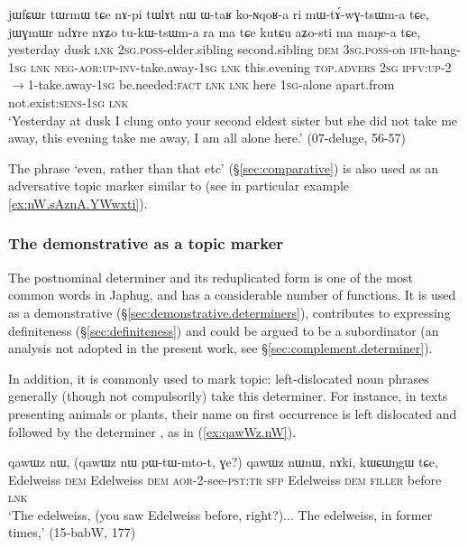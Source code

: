 \begin{exe}
\ex \label{ex:jWGmWr.ndAre}
\gll jɯfɕɯr tɯrmɯ tɕe nɤ-pi tɯlɤt nɯ ɯ-taʁ ko-ɴqoʁ-a ri mɯ-tɤ́-wɣ-tsɯm-a tɕe,
jɯɣmɯr ndɤre nɤʑo tu-kɯ-tsɯm-a ra ma tɕe kutɕu aʑo-sti ma maŋe-a tɕe, \\
 yesterday dusk \textsc{lnk} \textsc{2sg}.\textsc{poss}-elder.sibling  second.sibling \textsc{dem} \textsc{3sg}.\textsc{poss}-on \textsc{ifr}-hang-\textsc{1sg} \textsc{lnk} \textsc{neg}-\textsc{aor}:\textsc{up}-\textsc{inv}-take.away-\textsc{1sg} \textsc{lnk} this.evening \textsc{top}.\textsc{advers}  \textsc{2sg} \textsc{ipfv}:\textsc{up}-2$\rightarrow$1-take.away-\textsc{1sg} be.needed:\textsc{fact} \textsc{lnk} \textsc{lnk} here \textsc{1sg}-alone apart.from  not.exist:\textsc{sens}-\textsc{1sg} \textsc{lnk}  \\
\glt  `Yesterday at dusk I clung onto your second eldest sister but she did not take me away, this evening take me away, I am all alone here.' (07-deluge, 56-57)
\end{exe}

The phrase  `even, rather than that etc' (§\ref{sec:comparative}) is also used as an adversative topic marker similar to  (see in particular example \ref{ex:nW.sAznA.YWwxti}).

\subsubsection{The demonstrative  as a topic marker} \label{sec:nW.topic}
The postnominal determiner  and its reduplicated form  is one of the most common words in Japhug, and has a considerable number of functions. It is used as a demonstrative (§\ref{sec:demonstrative.determiners}), contributes to expressing definiteness (§\ref{sec:definiteness}) and could be argued to be a subordinator (an analysis not adopted in the present work, see §\ref{sec:complement.determiner}).

In addition, it is commonly used to mark topic: left-dislocated noun phrases generally (though not compulsorily) take this determiner. For instance, in texts presenting animals or plants, their name on first occurrence is left dislocated and followed by the determiner , as in (\ref{ex:qawWz.nW}).

\begin{exe}
\ex \label{ex:qawWz.nW}
\gll  qawɯz nɯ, (qawɯz nɯ pɯ-tɯ-mto-t, ɣe?)  qawɯz nɯnɯ, nɤki, kɯɕɯŋgɯ tɕe, \\
Edelweiss \textsc{dem} Edelweiss \textsc{dem} \textsc{aor}-2-see-\textsc{pst}:\textsc{tr} \textsc{sfp} Edelweiss \textsc{dem} \textsc{filler} before \textsc{lnk} \\
\glt `The edelweiss, (you saw Edelweiss before, right?)... The edelweiss, in former times,' (15-babW, 177)
\end{exe}

